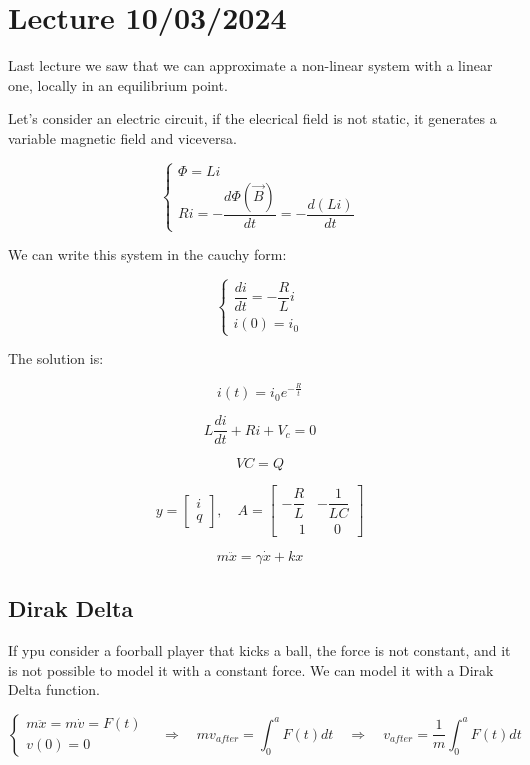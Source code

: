 \newpage
\chapter{Lecture 10/03/2024}

Last lecture we saw that we can approximate a non-linear system with a linear one, locally in an equilibrium point.

Let's consider an electric circuit, if the elecrical field is not static, it generates a variable magnetic field and viceversa. 

$$
\begin{cases}
\Phi = Li \\
Ri = -\dfrac{d\Phi(\vec B)}{dt} = -\dfrac{d(Li)}{dt}
\end{cases}
$$

We can write this system in the cauchy form:

$$
\begin{cases}
\dfrac{di}{dt} = - \dfrac RL i \\
i(0) = i_0
\end{cases}
$$

The solution is:

$$
i(t) = i_0 e^{-\frac Rt}
$$



$$
L \dfrac{di}{dt} + Ri + V_c = 0
$$

$$
VC = Q
$$

$$
y = \begin{bmatrix} i \\ q \end{bmatrix},
\quad
A = \begin{bmatrix}
    -\dfrac{R}{L} & -\dfrac{1}{LC} \\[10pt]
    \phantom{-}1  & \phantom{-}0
\end{bmatrix}
$$

$$
m\ddot x = \gamma \dot x + kx
$$

\newpage

\section{Dirak Delta}

If ypu consider a foorball player that kicks a ball, the force is not constant, and it is not possible to model it with a constant force. We can model it with a Dirak Delta function.

$$
\begin{cases}
m \ddot x = m \dot v = F(t) \\
v(0) = 0
\end{cases}
\quad \Rightarrow \quad
mv_{after} = \int_0^a F(t) dt \quad \Rightarrow \quad \boxed{v_{after} = \dfrac{1}{m} \int_0^a F(t) dt}
$$

